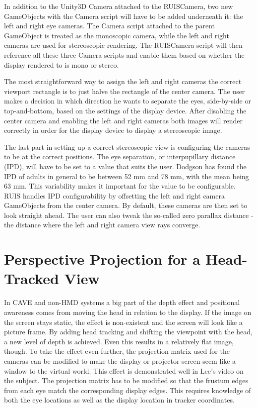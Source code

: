 \documentclass[12pt,a4paper,oneside,pdftex]{report}
\begin{document}
In addition to the Unity3D Camera attached to the RUISCamera, two new GameObjects with the Camera script will have to be added underneath it: the left and right eye cameras. The Camera script attached to the parent GameObject is treated as the monoscopic camera, while the left and right cameras are used for stereoscopic rendering. The RUISCamera script will then reference all these three Camera scripts and enable them based on whether the display rendered to is mono or stereo. 

The most straightforward way to assign the left and right cameras the correct viewport rectangle is to just halve the rectangle of the center camera. The user makes a decision in which direction he wants to separate the eyes, side-by-side or top-and-bottom, based on the settings of the display device. After disabling the center camera and enabling the left and right cameras both images will render correctly in order for the display device to display a stereoscopic image.

The last part in setting up a correct stereoscopic view is configuring the cameras to be at the correct positions. The eye separation, or interpupillary distance (IPD), will have to be set to a value that suits the user. Dodgson  \cite{Dodgson04variationand} has found the IPD of adults in general to be between 52 mm and 78 mm, with the mean being 63 mm. This variability makes it important for the value to be configurable. RUIS handles IPD configurability by offsetting the left and right camera GameObjects from the center camera. By default, these cameras are then set to look straight ahead. The user can also tweak the so-called zero parallax distance - the distance where the left and right camera view rays converge.

\section{Perspective Projection for a Head-Tracked View}
\label{section:perspectiveprojection}

In CAVE and non-HMD systems a big part of the depth effect and positional awareness comes from moving the head in relation to the display. If the image on the screen stays static, the effect is non-existent and the screen will look like a picture frame. By adding head tracking and shifting the viewpoint with the head, a new level of depth is achieved. Even this results in a relatively flat image, though. To take the effect even further, the projection matrix used for the cameras can be modified to make the display or projector screen seem like a window to the virtual world. This effect is demonstrated well in Lee's \cite{JohnnyLeePerspective} video on the subject. The projection matrix has to be modified so that the frustum edges from each eye match the corresponding display edges. This requires knowledge of both the eye locations as well as the display location in tracker coordinates.
\end{document}

